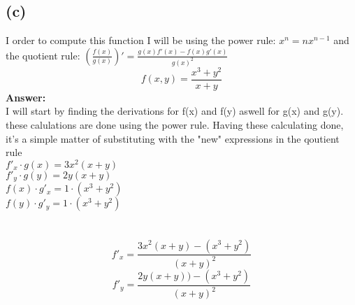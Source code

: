 \subsection{(c)}
I order to compute this function I will be using the power rule: $x^n = nx^{n-1}$ and the quotient rule: $(\frac{f(x)}{g(x)})' = \frac{g(x)f'(x) - f(x)g'(x)}{g(x)^2}$
$$f(x,y) = \frac{x^3+y^2}{x+y}$$
\textbf{Answer:}\\
I will start by finding the derivations for f(x) and f(y) aswell for g(x) and g(y). these calulations are done using the power rule. 
Having these calculating done, it's a simple matter of substituting with the "new" expressions in the qoutient rule
\\
$f'_{x} \cdot g(x) = 3x^2(x+y)$\\
$f'_{y} \cdot g(y) = 2y(x+y)$\\
$f(x) \cdot g'_{x} = 1\cdot(x^3+y^2)$\\
$f(y) \cdot g'_{y} = 1\cdot(x^3+y^2)$\\
\\
\\
$$f'_{x} = \frac{3x^2(x+y) - (x^3+y^2)}{(x+y)^2}$$
$$f'_{y} = \frac{2y(x+y)) - (x^3+y^2)}{(x+y)^2}$$